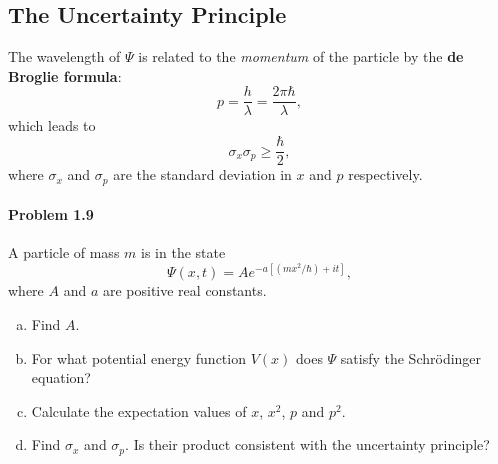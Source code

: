 \documentclass{article}
\begin{document}
\subsection{The Uncertainty Principle}

The wavelength of $\Psi$ is related to the \emph{momentum} of the particle by
the \textbf{de Broglie formula}:
\begin{equation}
  p = \frac{h}{\lambda} = \frac{2\pi\hbar}{\lambda}, \label{eq:de-brog}
\end{equation}
which leads to
\begin{equation}
  \sigma_x\sigma_p \geq \frac{\hbar}{2},
\end{equation}
where $\sigma_x$ and $\sigma_p$ are the standard deviation in $x$ and $p$
respectively.

\paragraph{Problem 1.9} A particle of mass $m$ is in the state \[ \Psi(x, t) =
Ae^{-a[(mx^2/\hbar) + it]}, \] where $A$ and $a$ are positive real constants.
\begin{enumerate}[(a)]
  \item Find $A$.
  \item For what potential energy function $V(x)$ does $\Psi$ satisfy the
    Schr\"{o}dinger equation?
  \item Calculate the expectation values of $x$, $x^2$, $p$ and $p^2$.
  \item Find $\sigma_x$ and $\sigma_p$. Is their product consistent with the
    uncertainty principle?
\end{enumerate}
\end{document}
